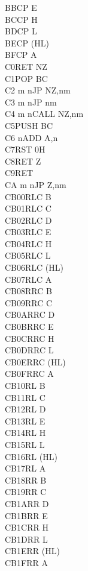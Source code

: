 \begin{multicols}{3}
{\begin{tabbing}
	BB\>CP E\\
	BC\>CP H\\
	BD\>CP L\\
	BE\>CP (HL)\\
	BF\>CP A\\
	C0\>RET NZ\\
	C1\>POP BC\\
	C2 m n\>JP NZ,nm\\
	C3 m n\>JP nm\\
	C4 m n\>CALL NZ,nm\\
	C5\>PUSH BC\\
	C6 n\>ADD A,n\\
	C7\>RST 0H\\
	C8\>RET Z\\
	C9\>RET\\
	CA m n\>JP Z,nm\\
	CB00\>RLC B\\
	CB01\>RLC C\\
	CB02\>RLC D\\
	CB03\>RLC E\\
	CB04\>RLC H\\
	CB05\>RLC L\\
	CB06\>RLC (HL)\\
	CB07\>RLC A\\
	CB08\>RRC B\\
	CB09\>RRC C\\
	CB0A\>RRC D\\
	CB0B\>RRC E\\
	CB0C\>RRC H\\
	CB0D\>RRC L\\
	CB0E\>RRC (HL)\\
	CB0F\>RRC A\\
	CB10\>RL B\\
	CB11\>RL C\\
	CB12\>RL D\\
	CB13\>RL E\\
	CB14\>RL H\\
	CB15\>RL L\\
	CB16\>RL (HL)\\
	CB17\>RL A\\
	CB18\>RR B\\
	CB19\>RR C\\
	CB1A\>RR D\\
	CB1B\>RR E\\
	CB1C\>RR H\\
	CB1D\>RR L\\
	CB1E\>RR (HL)\\
	CB1F\>RR A\\

\end{tabbing}}
\end{multicols}
